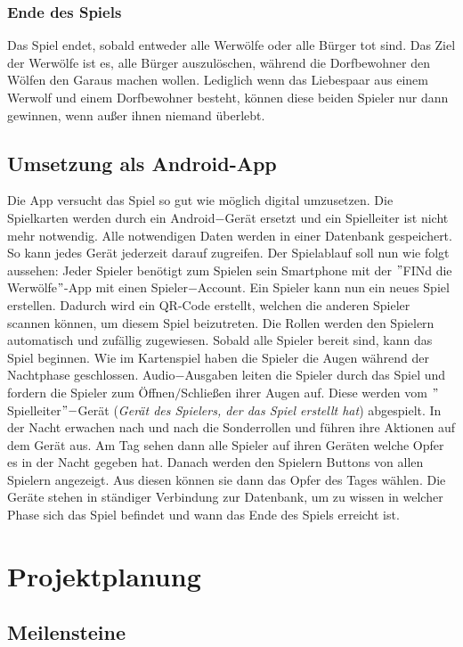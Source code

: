 \documentclass[12pt, a4paper]{article}
\begin{document}
		\subsubsection{Ende des Spiels}
Das Spiel endet, sobald entweder alle Werwölfe oder alle Bürger tot sind.
Das Ziel der Werwölfe ist es, alle Bürger auszulöschen, während die Dorfbewohner den Wölfen den
Garaus machen wollen. Lediglich wenn das Liebespaar aus einem Werwolf und einem Dorfbewohner besteht,
können diese beiden Spieler nur dann gewinnen, wenn außer ihnen niemand überlebt.


	\subsection{Umsetzung als Android-App}
Die App versucht das Spiel so gut wie möglich digital umzusetzen. Die Spielkarten werden durch ein Android$-$Gerät ersetzt und ein Spielleiter ist nicht mehr notwendig. Alle notwendigen Daten werden in einer Datenbank gespeichert. So kann jedes Gerät jederzeit darauf zugreifen.
Der Spielablauf soll nun wie folgt aussehen: 
Jeder Spieler benötigt zum Spielen sein Smartphone mit der $"$FINd die Werwölfe$"$-App mit einen Spieler$-$Account. Ein Spieler kann nun ein neues Spiel erstellen. Dadurch wird ein QR-Code erstellt, welchen die anderen Spieler scannen können, um diesem Spiel beizutreten. Die Rollen werden den Spielern automatisch und zufällig zugewiesen. Sobald alle Spieler bereit sind, kann das Spiel beginnen. Wie im Kartenspiel haben die Spieler die Augen während der Nachtphase geschlossen. Audio$-$Ausgaben leiten die Spieler durch das Spiel und fordern die Spieler zum Öffnen$/$Schließen ihrer Augen auf. Diese werden vom $"$Spielleiter$"-$Gerät (\textit{Gerät des Spielers, der das Spiel erstellt hat}) abgespielt. In der Nacht erwachen nach und nach die Sonderrollen und führen ihre Aktionen auf dem Gerät aus. Am Tag sehen dann alle Spieler auf ihren Geräten welche Opfer es in der Nacht gegeben hat. Danach werden den Spielern Buttons von allen Spielern angezeigt. Aus diesen können sie dann das Opfer des Tages wählen.
Die Geräte stehen in ständiger Verbindung zur Datenbank, um zu wissen in welcher Phase sich das Spiel befindet und wann das Ende des Spiels erreicht ist. 


\newpage
\section{Projektplanung}
	
	\subsection{Meilensteine}
		
\end{document}
